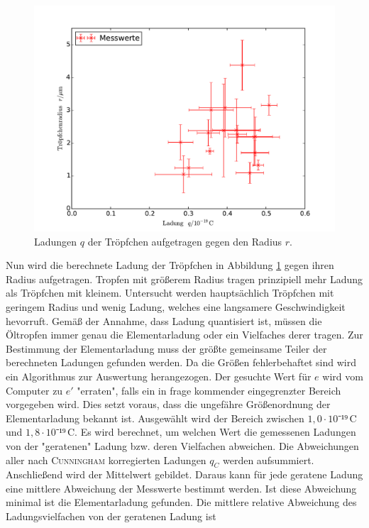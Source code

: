 \begin{figure}
	\centering
	\includegraphics[width=\textwidth]{Bilder/plot_messwerte.pdf}
	\caption{Ladungen $q$ der Tröpfchen aufgetragen gegen den Radius $r$.}
	\label{fig:1}
\end{figure}
Nun wird die berechnete Ladung der Tröpfchen in Abbildung \ref{fig:1} gegen ihren Radius aufgetragen. Tropfen mit größerem Radius tragen prinzipiell mehr Ladung als Tröpfchen mit kleinem. Untersucht werden hauptsächlich Tröpfchen mit geringem Radius und wenig Ladung, welches eine langsamere Geschwindigkeit hevorruft.
Gemäß der Annahme, dass Ladung quantisiert ist, müssen die Öltropfen immer genau die Elementarladung oder ein Vielfaches derer tragen. Zur Bestimmung der Elementarladung muss der größte gemeinsame Teiler der berechneten Ladungen gefunden werden. Da die Größen fehlerbehaftet sind wird ein Algorithmus zur Auswertung herangezogen.
Der gesuchte Wert für $e$ wird vom Computer zu $e'$ "erraten", falls ein in frage kommender eingegrenzter Bereich vorgegeben wird. Dies setzt voraus, dass die ungefähre Größenordnung der Elementarladung bekannt ist. Ausgewählt wird der Bereich zwischen $1,0\cdot 10⁻¹⁹\,\si\coulomb$ und $1,8\cdot 10⁻¹⁹\,\si\coulomb$. Es wird berechnet, um welchen Wert die gemessenen Ladungen von der "geratenen" Ladung bzw. deren Vielfachen abweichen. Die Abweichungen aller nach \textsc{Cunningham} korregierten Ladungen $q_C$ werden aufsummiert. Anschließend wird der Mittelwert gebildet. Daraus kann für jede geratene Ladung eine mittlere Abweichung der Messwerte bestimmt werden. Ist diese Abweichung minimal ist die Elementarladung gefunden. Die mittlere relative Abweichung des Ladungsvielfachen von der geratenen Ladung ist

